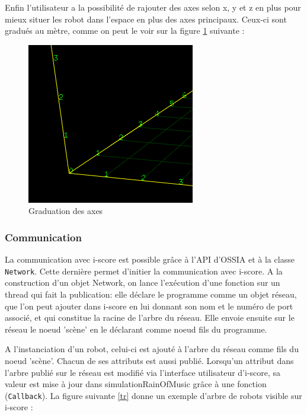 Enfin l'utilisateur a la possibilité de rajouter des axes selon x, y et z en plus pour mieux situer les robot dans l'espace en plus des axes principaux. Ceux-ci sont gradués au mètre, comme on peut le voir sur la figure \ref{grad} suivante :
					
\begin{figure}[H]
\centering
\includegraphics[scale=0.8]{imgs/graduation}
\caption{Graduation des axes}
\label{grad}
\end{figure}

\subsubsection{Communication}

La communication avec i-score est possible grâce à l'API d'OSSIA et à la classe \verb|Network|. Cette dernière permet d'initier la communication avec i-score. A la construction d'un objet Network, on lance l'exécution d'une fonction sur un thread qui fait la publication: elle déclare le programme comme un objet réseau, que l'on peut ajouter dans i-score en lui donnant son nom et le numéro de port associé, et qui constitue la racine de l'arbre du réseau. Elle envoie ensuite sur le réseau le noeud 'scène' en le déclarant comme noeud fils du programme.

A l'instanciation d'un robot, celui-ci est ajouté à l'arbre du réseau comme fils du noeud 'scène'. Chacun de ses attributs est aussi publié. Lorsqu'un attribut dans l'arbre publié sur le réseau est modifié via l'interface utilisateur d'i-score, sa valeur est mise à jour dans simulationRainOfMusic grâce à une fonction (\verb|Callback|). La figure suivante \ref{tr} donne un exemple d'arbre de robots visible sur i-score :


